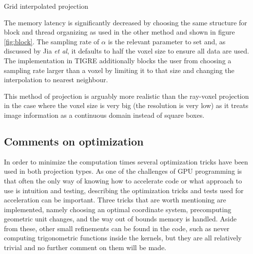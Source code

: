 \begin{algorithm}

\caption{Grid interpolated projection
\label{alg:gridinterp}}
\begin{algorithmic}[1]
    
\EndFor
{}
\Ensure{} 
\end{algorithmic}

\end{algorithm}


The memory latency is significantly decreased by choosing the same structure for block and thread organizing as used in the other method and shown in figure \ref{fig:block}. The sampling rate of $\alpha$ is the relevant parameter to set and, as discussed by Jia \textit{et al}\cite{jia2012gpu}, it defaults to half the voxel size to ensure all data are used. The implementation in TIGRE additionally blocks the user from choosing a sampling rate larger than a voxel by limiting it to that size and changing the interpolation to nearest neighbour.

This method of projection is arguably more realistic than the ray-voxel projection in the case where the voxel size is very big (the resolution is very low) as it treats image information as a continuous domain instead of square boxes.

\subsection{Comments on optimization}

In order to minimize the computation times several optimization tricks have been used in both projection types. As one of the challenges of GPU programming is that often the only way of knowing how to accelerate code or what approach to use is intuition and testing, describing the optimization tricks and tests used for acceleration can be important. Three tricks that are worth mentioning are implemented, namely choosing an optimal coordinate system, precomputing geometric unit changes, and the way out of bounds memory is handled. Aside from these, other small refinements can be found in the code, such as never computing trigonometric functions inside the kernels, but they are all relatively trivial and no further comment on them will be made.

